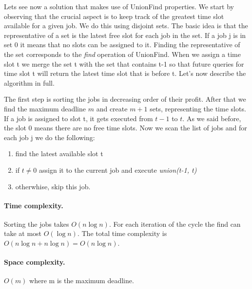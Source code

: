 \documentclass{article}
\begin{document}
\medskip

Lets see now a solution that makes use of UnionFind properties. We start by observing that the crucial aspect
is to keep track of the greatest time slot available for a given job. We do this using disjoint sets. The basic idea is that the representative of a set
is the latest free slot for each job in the set. If a job j is in set 0 it means that no slots can be assigned to it. Finding the representative
of the set corresponds to the \emph{find} operation of UnionFind. When we assign a time slot t
we merge the set t with the set that contains t-1 so that future queries for time slot t will return the latest time slot that is before t. Let's now describe the algorithm in full.

\medskip

The first step is sorting the jobs in decreasing order of their profit. After that we find the maximum deadline $m$ and create $m+1$ sets, representing the time slots.
If a job is assigned to slot t, it gets executed from $t-1$ to $t$. As we said before, the slot 0 means there are no free time slots. Now we scan the list  of jobs and for each job j
we do the following:\begin{enumerate}
    \item find the latest available slot t
    \item if $t \neq 0$ assign it to the current job and
    execute \emph{union(t-1, t)}
    \item otherwhise, skip this job.
\end{enumerate}

\paragraph{Time complexity.} Sorting the jobs takes $O(n \log n)$. For each iteration of the cycle
the find can take at most $O(\log n)$. The total time complexity is $O(n\log n + n\log n) = O(n\log n)$.
\paragraph{Space complexity.} $O(m)$ where m is the maximum deadline.



\end{document}
